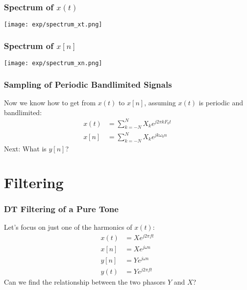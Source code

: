 \documentclass{beamer}
\begin{document}
\begin{frame}
  \frametitle{Spectrum of $x(t)$}

  \centerline{\texttt{[image: exp/spectrum\_xt.png]}}
\end{frame}

\begin{frame}
  \frametitle{Spectrum of $x[n]$}

  \centerline{\texttt{[image: exp/spectrum\_xn.png]}}
\end{frame}

\begin{frame}
  \frametitle{Sampling of Periodic Bandlimited Signals}
  Now we know how to get from $x(t)$ to $x[n]$, assuming $x(t)$ is
  periodic and bandlimited:
  \begin{align*}
    x(t)&=\sum_{k=-N}^{N}X_ke^{j2\pi kF_0t}\\
    x[n]&=\sum_{k=-N}^{N}X_ke^{jk\omega_0n}
  \end{align*}
  Next: What is $y[n]$?
\end{frame}

\section{Filtering}
\setcounter{subsection}{1}

\begin{frame}
  \frametitle{DT Filtering of a Pure Tone}
  
  \begin{center}
  \end{center}
  Let's focus on just one of the harmonics of $x(t)$:
  \begin{align*}
    x(t)&=Xe^{j2\pi ft}\\
    x[n]&=Xe^{j\omega n}\\
    y[n]&=Ye^{j\omega n}\\
    y(t)&=Ye^{j2\pi ft}
  \end{align*}
  Can we find the relationship between the two phasors $Y$ and $X$?
\end{frame}
\end{document}
